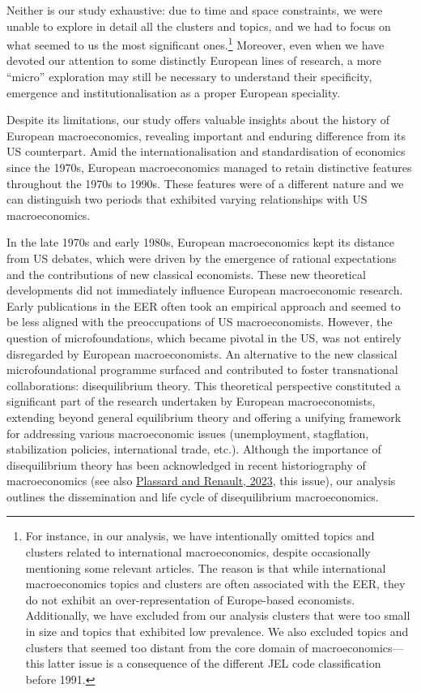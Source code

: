 \documentclass[
  12pt,
  onecolumn]{article}
\begin{document}
Neither is our study exhaustive: due to time and space constraints, we were unable to explore in detail all the clusters and topics, and we had to focus on what seemed to us the most significant ones.\footnote{For instance, in our analysis, we have intentionally omitted topics and clusters related to international macroeconomics, despite occasionally mentioning some relevant articles. The reason is that while international macroeconomics topics and clusters are often associated with the EER, they do not exhibit an over-representation of Europe-based economists. Additionally, we have excluded from our analysis clusters that were too small in size and topics that exhibited low prevalence. We also excluded topics and clusters that seemed too distant from the core domain of macroeconomics---this latter issue is a consequence of the different JEL code classification before 1991.} Moreover, even when we have devoted our attention to some distinctly European lines of research, a more ``micro'' exploration may still be necessary to understand their specificity, emergence and institutionalisation as a proper European speciality.

Despite its limitations, our study offers valuable insights about the history of European macroeconomics, revealing important and enduring difference from its US counterpart. Amid the internationalisation and standardisation of economics since the 1970s, European macroeconomics managed to retain distinctive features throughout the 1970s to 1990s. These features were of a different nature and we can distinguish two periods that exhibited varying relationships with US macroeconomics.

In the late 1970s and early 1980s, European macroeconomics kept its distance from US debates, which were driven by the emergence of rational expectations and the contributions of new classical economists. These new theoretical developments did not immediately influence European macroeconomic research. Early publications in the EER often took an empirical approach and seemed to be less aligned with the preoccupations of US macroeconomists. However, the question of microfoundations, which became pivotal in the US, was not entirely disregarded by European macroeconomists. An alternative to the new classical microfoundational programme surfaced and contributed to foster transnational collaborations: disequilibrium theory. This theoretical perspective constituted a significant part of the research undertaken by European macroeconomists, extending beyond general equilibrium theory and offering a unifying framework for addressing various macroeconomic issues (unemployment, stagflation, stabilization policies, international trade, etc.). Although the importance of disequilibrium theory has been acknowledged in recent historiography of macroeconomics (see also \protect\hyperlink{ref-plassard2023}{Plassard and Renault, 2023}, this issue), our analysis outlines the dissemination and life cycle of disequilibrium macroeconomics.
\end{document}
